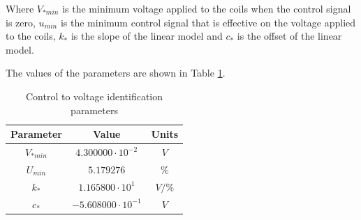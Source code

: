 Where $V_{*min}$ is the minimum voltage applied to the coils when the control signal is zero, $u_{min}$ is the minimum control signal that is effective on the voltage applied to the coils, $k_*$ is the slope of the linear model and $c_*$ is the offset of the linear model.

The values of the parameters are shown in Table \ref{tab:control_to_voltage_parameters}.

\begin{table}[H]

    \centering
    \begin{tabular}{|c|c|c|}
        \hline
        \textbf{Parameter} & \textbf{Value}            & \textbf{Units} \\
        \hline
        $V_{*min}$         & $4.300000 \cdot 10^{-2}$  & $V$            \\
        $U_{min}$          & $5.179276$                & $\%$           \\
        $k_*$              & $1.165800 \cdot 10^{1}$   & $V/\%$         \\
        $c_*$              & $-5.608000 \cdot 10^{-1}$ & $V$            \\
        \hline
    \end{tabular}

    \caption{Control to voltage identification parameters}
    \label{tab:control_to_voltage_parameters}

\end{table}